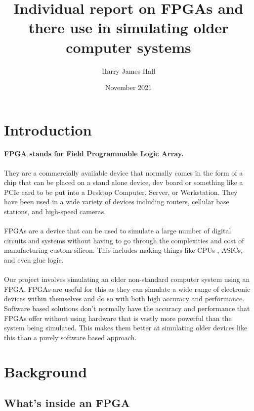 \documentclass[twocolumn]{article}
\title{Individual report on FPGAs and there use in simulating older computer systems}
\author{Harry James Hall}
\date{November 2021}
\begin{document}
\maketitle

\section{Introduction}
\paragraph{FPGA stands for Field Programmable Logic Array.} They are a commercially available device that normally comes in the form of a chip that can be placed on a stand alone device, dev board or something like a PCIe card to be put into a Desktop Computer, Server, or Workstation. They have been used in a wide variety of devices including routers, cellular base stations, and high-speed cameras.

\paragraph{}FPGAs are a device that can be used to simulate a large number of digital circuits and systems without having to go through the complexities and cost of manufacturing custom silicon. This includes making things like CPUs \autocite{hardesty_2012}, ASICs, and even glue logic.

\paragraph{}Our project involves simulating an older non-standard computer system using an FPGA. FPGAs are useful for this as they can simulate a wide range of electronic devices within themselves and do so with both high accuracy and performance. Software based solutions don't normally have the accuracy and performance that FPGAs offer without using hardware that is vastly more powerful than the system being simulated. This makes them better at simulating older devices like this than a purely software based approach.

\section{Background}
\subsection{What's inside an FPGA}
\end{document}

